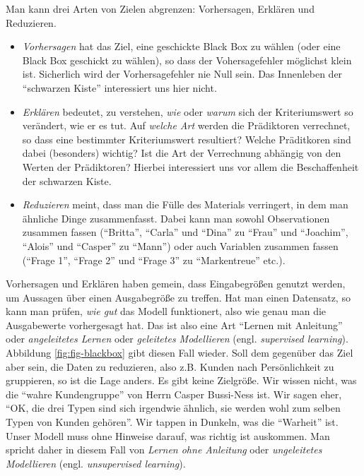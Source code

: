 \documentclass[12pt,]{book}
\begin{document}
Man kann drei Arten von Zielen abgrenzen: Vorhersagen, Erklären und
Reduzieren.

\begin{itemize}
\item
  \emph{Vorhersagen} hat das Ziel, eine geschickte
  Black Box zu wählen (oder eine Black Box geschickt zu wählen), so dass
  der Vohersagefehler möglichst klein ist. Sicherlich wird der
  Vorhersagefehler nie Null sein. Das Innenleben der ``schwarzen Kiste''
  interessiert uns hier nicht.
\item
  \emph{Erklären} bedeutet, zu verstehen, \emph{wie}
  oder \emph{warum} sich der Kriteriumswert so verändert, wie er es tut.
  Auf \emph{welche Art} werden die Prädiktoren verrechnet, so dass eine
  bestimmter Kriteriumswert resultiert? Welche Präditkoren sind dabei
  (besonders) wichtig? Ist die Art der Verrechnung abhängig von den
  Werten der Prädiktoren? Hierbei interessiert uns vor allem die
  Beschaffenheit der schwarzen Kiste.
\item
  \emph{Reduzieren} meint, dass man die Fülle des
  Materials verringert, in dem man ähnliche Dinge zusammenfasst. Dabei
  kann man sowohl Observationen zusammen fassen (``Britta'', ``Carla''
  und ``Dina'' zu ``Frau'' und ``Joachim'', ``Alois'' und ``Casper'' zu
  ``Mann'') oder auch Variablen zusammen fassen (``Frage 1'', ``Frage
  2'' und ``Frage 3'' zu ``Markentreue'' etc.).
\end{itemize}

Vorhersagen und Erklären haben gemein, dass Eingabegrößen genutzt
werden, um Aussagen über einen Ausgabegröße zu treffen. Hat man einen
Datensatz, so kann man prüfen, \emph{wie gut} das Modell funktionert,
also wie genau man die Ausgabewerte vorhergesagt hat. Das ist also eine
Art ``Lernen mit Anleitung'' oder \emph{angeleitetes Lernen} oder
\emph{geleitetes Modellieren} (engl. \emph{supervised learning}).
Abbildung \ref{fig:fig-blackbox} gibt diesen Fall wieder. Soll dem
gegenüber das Ziel aber sein, die Daten zu reduzieren, also z.B. Kunden
nach Persönlichkeit zu gruppieren, so ist die Lage anders. Es gibt keine
Zielgröße. Wir wissen nicht, was die ``wahre Kundengruppe'' von Herrn
Casper Bussi-Ness ist. Wir sagen eher, ``OK, die drei Typen sind sich
irgendwie ähnlich, sie werden wohl zum selben Typen von Kunden
gehören''. Wir tappen in Dunkeln, was die ``Warheit'' ist. Unser Modell
muss ohne Hinweise darauf, was richtig ist auskommen. Man spricht daher
in diesem Fall von \emph{Lernen ohne
Anleitung} oder \emph{ungeleitetes
Modellieren} (engl. \emph{unsupervised
learning}).
\end{document}
